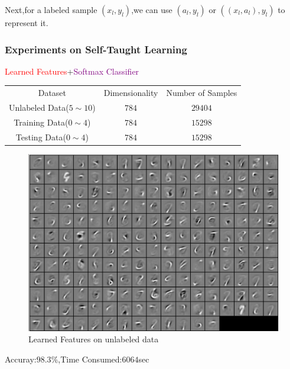 \documentclass{beamer}
\begin{document}
\begin{CJK*}{UTF8}{gbsn}
\begin{frame}
\begin{columns}
\begin{column}{0.5\linewidth}
\begin{figure}
\end{figure}
\end{column}
\end{columns}
Next,for a labeled sample $(x_l,y_l)$,we can use $(a_l,y_l)$ or $((x_l,a_l),y_l)$ to represent it.
\end{frame}

\begin{frame}\frametitle{Experiments on Self-Taught Learning}
\begin{center}
\textcolor{red}{Learned Features}+\textcolor{purple}{Softmax Classifier}
\end{center}
\begin{table}
\begin{tabular}{|c|c|c|}
\hline
Dataset & Dimensionality & Number of Samples\\
\rowcolor{rowcolor1}
Unlabeled Data($5\sim 10$) & $784$ & $29404$\\
\rowcolor{rowcolor2}
Training Data($0\sim 4$) & $784$ & $15298$\\
\rowcolor{rowcolor3}
Testing Data($0\sim 4$) & $784$ & $15298$\\
\end{tabular}
\end{table}
\begin{figure}
\centering
\includegraphics[scale=0.1]{images/MNIST_weights}
\caption{Learned Features on unlabeled data}
\end{figure}
\begin{center}
Accuray:$98.3\%$,Time Consumed:$6064$sec
\end{center}
\end{frame}

\end{CJK*}
\end{document}
